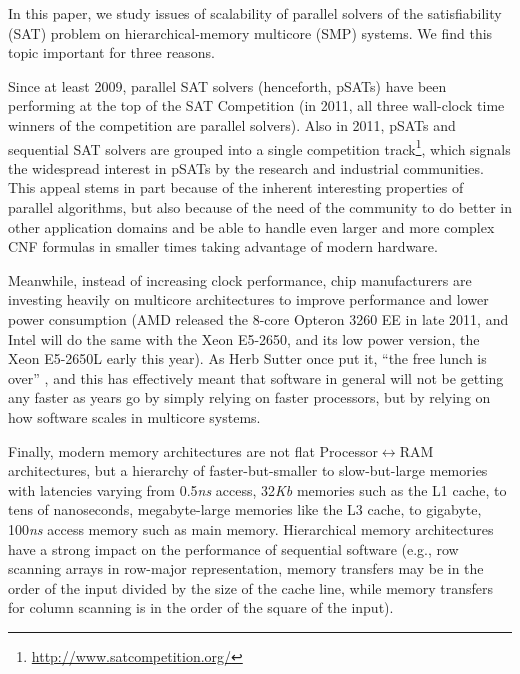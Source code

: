 
In this paper, we study issues of scalability of parallel solvers of
the satisfiability (SAT) problem on hierarchical-memory multicore
(SMP) systems. We find this topic important for three reasons.

Since at least 2009, parallel SAT solvers (henceforth, pSATs) have
been performing at the top of the SAT Competition (in 2011, all three
wall-clock time winners of the competition are parallel solvers).
Also in 2011, pSATs and sequential SAT solvers are grouped into a
single competition
track\footnote{\url{http://www.satcompetition.org/}}, which signals
the widespread interest in pSATs by the research and industrial
communities. This appeal stems in part because of the inherent
interesting properties of parallel algorithms, but also because of the
need of the community to do better in other application domains and be
able to handle even larger and more complex CNF formulas in smaller
times taking advantage of modern hardware.

Meanwhile, instead of increasing clock performance, chip manufacturers
are investing heavily on multicore architectures to improve
performance and lower power consumption (AMD released the 8-core
Opteron 3260 EE in late 2011, and Intel will do the same with the Xeon
E5-2650, and its low power version, the Xeon E5-2650L early this
year). As Herb Sutter once put it, ``the free lunch is over''
\cite{FreeLunchIsOver}, and this has effectively meant that software
in general will not be getting any faster as years go by simply
relying on faster processors, but by relying on how software scales in
multicore systems.

Finally, modern memory architectures are not flat
Processor$\leftrightarrow$RAM architectures, but a hierarchy of
faster-but-smaller to slow-but-large memories with latencies varying
from 0.5{\it ns} access, 32{\it Kb} memories such as the L1 cache, to
tens of nanoseconds, megabyte-large memories like the L3 cache, to
gigabyte, 100{\it ns} access memory such as main memory. Hierarchical
memory architectures have a strong impact on the performance of
sequential software (e.g., row scanning arrays in row-major
representation, memory transfers may be in the order of the input
divided by the size of the cache line, while memory transfers for
column scanning is in the order of the square of the input). %

